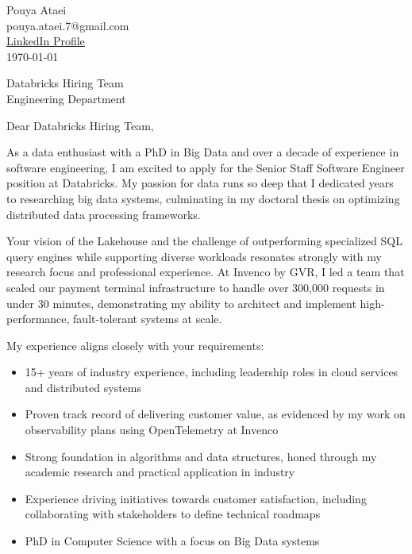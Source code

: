 \documentclass[11pt,a4paper]{article}
\begin{document}
\begin{flushright}
Pouya Ataei\\
pouya.ataei.7@gmail.com\\
\href{https://www.linkedin.com/in/pouya-ataei-bb1254ba}{LinkedIn Profile}\\
\today
\end{flushright}

\begin{flushleft}
Databricks Hiring Team\\
Engineering Department
\end{flushleft}

Dear Databricks Hiring Team,

\vspace{1em}

As a data enthusiast with a PhD in Big Data and over a decade of experience in software engineering, I am excited to apply for the Senior Staff Software Engineer position at Databricks. My passion for data runs so deep that I dedicated years to researching big data systems, culminating in my doctoral thesis on optimizing distributed data processing frameworks.

Your vision of the Lakehouse and the challenge of outperforming specialized SQL query engines while supporting diverse workloads resonates strongly with my research focus and professional experience. At Invenco by GVR, I led a team that scaled our payment terminal infrastructure to handle over 300,000 requests in under 30 minutes, demonstrating my ability to architect and implement high-performance, fault-tolerant systems at scale.

My experience aligns closely with your requirements:

\begin{itemize}
    \item 15+ years of industry experience, including leadership roles in cloud services and distributed systems
    \item Proven track record of delivering customer value, as evidenced by my work on observability plans using OpenTelemetry at Invenco
    \item Strong foundation in algorithms and data structures, honed through my academic research and practical application in industry
    \item Experience driving initiatives towards customer satisfaction, including collaborating with stakeholders to define technical roadmaps
    \item PhD in Computer Science with a focus on Big Data systems
\end{itemize}
\end{document}
